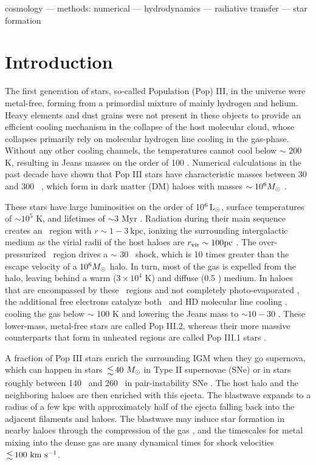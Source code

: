 \documentclass[useAMS,usenatbib]{mn2e}
\begin{document}
\begin{keywords}
  cosmology --- methods: numerical --- hydrodynamics ---
  radiative transfer --- star formation
\end{keywords}

\section{Introduction}

The first generation of stars, so-called Population (Pop) III, in the
universe were metal-free, forming from a primordial mixture of mainly
hydrogen and helium.  Heavy elements and dust grains were not present
in these objects to provide an efficient cooling mechanism in the
collapse of the host molecular cloud, whose collapses primarily rely
on molecular hydrogen line cooling in the gas-phase.  Without any
other cooling channels, the temperatures cannot cool below $\sim$ 200
K, resulting in Jeans masses on the order of 100 \Ms.  Numerical
calculations in the past decade have shown that Pop III stars
have characteristic masses between 30 and 300
\Ms~\citep[e.g.][]{ABN02, Bromm02_P3, OShea07a}, which form in dark
matter (DM) haloes with masses $\sim 10^6 \Ms$
\citep[e.g.][]{MacLow86, Shapiro87, Tegmark97}.

These stars have large luminosities on the order of 10$^6 {\rm\,L_\odot}$,
surface temperatures of $\sim 10^5$ K, and lifetimes of $\sim3$ Myr
\citep{Bond84, Schaerer02}.  Radiation during their main sequence
creates an \hii~region with $r \sim 1-3~\mathrm{kpc}$, ionizing the
surrounding intergalactic medium as the virial radii of the host
haloes are $r_{\rm vir} \sim 100 \mathrm{pc}$ \citep{Whalen04,
  Kitayama04, Alvarez06, Abel07}.  The over-pressurized \hii~region
drives a $\sim$ 30 \kms~shock, which is 10 times greater than the
escape velocity of a $10^6 \Ms$ halo.  In turn, most of the gas is
expelled from the halo, leaving behind a warm ($3 \times 10^4$ K) and
diffuse (0.5 \cubecm) medium.  In haloes that are encompassed by these
\hii~regions and not completely photo-evaporated \citep{Shapiro04,
  whalen08}, the additional free electrons catalyze both \hh~and HD
molecular line cooling \citep{OShea05, Johnson06, Yoshida07,
  McGreer08}, cooling the gas below $\sim$ 100 K and lowering the
Jeans mass to $\sim10-30$ \Ms.  These lower-mass, metal-free stars
are called Pop III.2, whereas their more massive counterparts
that form in unheated regions are called Pop III.1 stars
\citep{Norman08}.

A fraction of Pop III stars enrich the surrounding IGM when
they go supernova, which can happen in stars $\la 40~\Ms$ in Type II
supernovae (SNe) or in stars roughly between 140 \Ms~and 260 \Ms~in
pair-instability SNe \citep[PISNe;][]{2002ApJ...567..532H}. The host
halo and the neighboring haloes are then enriched with this ejecta.
The blastwave expands to a radius of a few kpc \citep{Bromm03_SN,
  Wise08_Gal, Greif10} with approximately half of the ejecta falling
back into the adjacent filaments and haloes.  The blastwave may induce
star formation in nearby haloes through the compression of the gas
\citep{Shapiro87, Ferrara98, Mackey03}, and the timescales for metal
mixing into the dense gas are many dynamical times \citep{Cen08} for
shock velocities $\la 100~\kms$.
\end{document}
